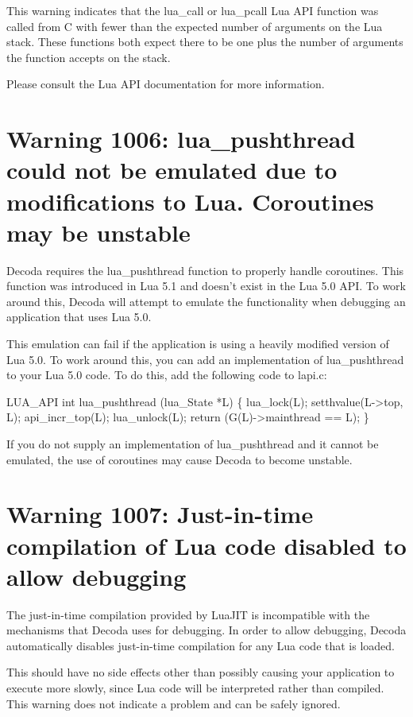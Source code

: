 This warning indicates that the lua_call or lua_pcall Lua API function was called from C
with fewer than the expected number of arguments on the Lua stack.  These functions both
expect there to be one plus the number of arguments the function accepts on the stack.

Please consult the Lua API documentation for more information.

\section{Warning 1006: lua_pushthread could not be emulated due to modifications to Lua. Coroutines may be unstable}\label{warning_1006}

Decoda requires the lua_pushthread function to properly handle coroutines. This
function was introduced in Lua 5.1 and doesn't exist in the Lua 5.0 API. To
work around this, Decoda will attempt to emulate the functionality when debugging
an application that uses Lua 5.0.

This emulation can fail if the application is using a heavily modified version of
Lua 5.0. To work around this, you can add an implementation of lua_pushthread to
your Lua 5.0 code. To do this, add the following code to lapi.c:

{\verbatim LUA_API int lua_pushthread (lua_State *L) \{
  lua_lock(L);
  setthvalue(L->top, L);
  api_incr_top(L);
  lua_unlock(L);
  return (G(L)->mainthread == L);
\}
}

If you do not supply an implementation of lua_pushthread and it cannot be emulated,
the use of coroutines may cause Decoda to become unstable.

\section{Warning 1007: Just-in-time compilation of Lua code disabled to allow debugging}\label{warning_1007}

The just-in-time compilation provided by LuaJIT is incompatible with the mechanisms that Decoda
uses for debugging. In order to allow debugging, Decoda automatically disables just-in-time
compilation for any Lua code that is loaded.

This should have no side effects other than possibly causing your application to execute more slowly,
since Lua code will be interpreted rather than compiled. This warning does not indicate a problem
and can be safely ignored.

